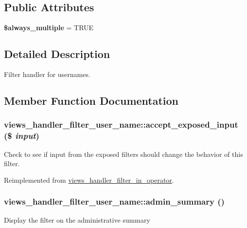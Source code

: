 \subsection*{Public Attributes}
\begin{DoxyCompactItemize}
\item 
\hypertarget{classviews__handler__filter__user__name_a85d7ddc28b8758e2cca3959738d39feb}{
{\bfseries \$always\_\-multiple} = TRUE}
\label{classviews__handler__filter__user__name_a85d7ddc28b8758e2cca3959738d39feb}

\end{DoxyCompactItemize}


\subsection{Detailed Description}
Filter handler for usernames. 

\subsection{Member Function Documentation}
\hypertarget{classviews__handler__filter__user__name_aa6ae18031b13da1c92d83b8c5de74c15}{
\subsubsection[{accept\_\-exposed\_\-input}]{\setlength{\rightskip}{0pt plus 5cm}views\_\-handler\_\-filter\_\-user\_\-name::accept\_\-exposed\_\-input (\$ {\em input})}}
\label{classviews__handler__filter__user__name_aa6ae18031b13da1c92d83b8c5de74c15}
Check to see if input from the exposed filters should change the behavior of this filter. 

Reimplemented from \hyperlink{classviews__handler__filter__in__operator_aff2b25941729b9ca81e1e53bb8e95a96}{views\_\-handler\_\-filter\_\-in\_\-operator}.\hypertarget{classviews__handler__filter__user__name_aba7659d0d6c937d9c346e8ed3af532b6}{
\subsubsection[{admin\_\-summary}]{\setlength{\rightskip}{0pt plus 5cm}views\_\-handler\_\-filter\_\-user\_\-name::admin\_\-summary ()}}
\label{classviews__handler__filter__user__name_aba7659d0d6c937d9c346e8ed3af532b6}
Display the filter on the administrative summary 

